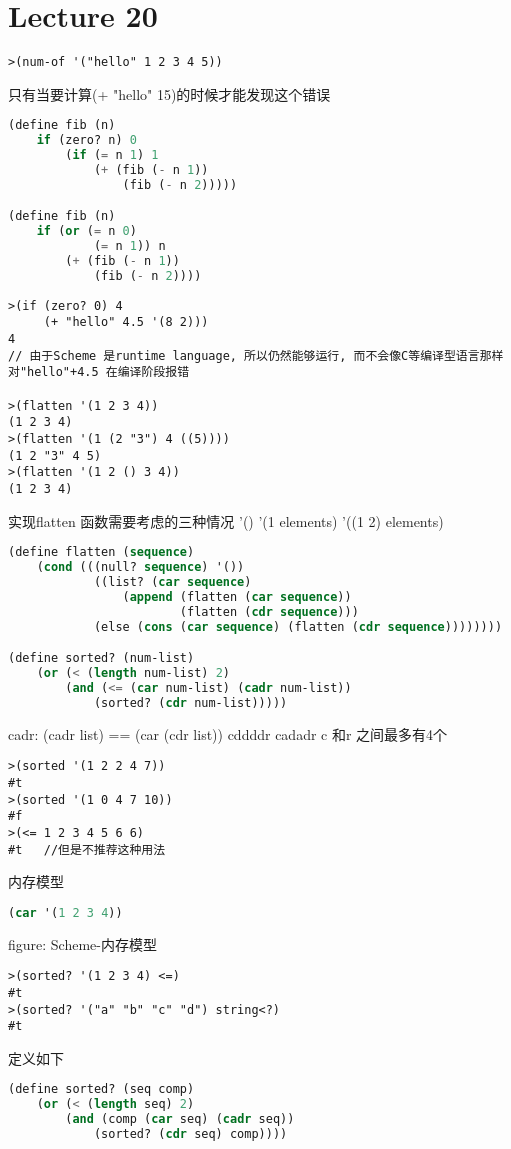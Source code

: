 \documentclass{article}
\begin{document}
\section{Lecture 20}
\begin{verbatim}
>(num-of '("hello" 1 2 3 4 5))
\end{verbatim}
只有当要计算(+ "hello" 15)的时候才能发现这个错误

\begin{lstlisting}[language = Lisp]
(define fib (n)
	if (zero? n) 0
		(if (= n 1) 1
			(+ (fib (- n 1))
				(fib (- n 2)))))

(define fib (n)
	if (or (= n 0)
			(= n 1)) n
		(+ (fib (- n 1))
			(fib (- n 2))))
\end{lstlisting}

\begin{verbatim}
>(if (zero? 0) 4
	 (+ "hello" 4.5 '(8 2)))
4
// 由于Scheme 是runtime language, 所以仍然能够运行, 而不会像C等编译型语言那样对"hello"+4.5 在编译阶段报错

>(flatten '(1 2 3 4))
(1 2 3 4)
>(flatten '(1 (2 "3") 4 ((5))))
(1 2 "3" 4 5)
>(flatten '(1 2 () 3 4))
(1 2 3 4)
\end{verbatim}

实现flatten 函数需要考虑的三种情况
'()
'(1 elements)
'((1 2) elements)

\begin{lstlisting}[language = Lisp]
(define flatten (sequence)
	(cond (((null? sequence) '())
			((list? (car sequence)
				(append (flatten (car sequence))
						(flatten (cdr sequence)))
			(else (cons (car sequence) (flatten (cdr sequence))))))))

(define sorted? (num-list)
	(or (< (length num-list) 2)
		(and (<= (car num-list) (cadr num-list))
			(sorted? (cdr num-list)))))
\end{lstlisting}
cadr: (cadr list) == (car (cdr list))
cddddr
cadadr
c 和r 之间最多有4个

\begin{verbatim}
>(sorted '(1 2 2 4 7))
#t
>(sorted '(1 0 4 7 10))
#f
>(<= 1 2 3 4 5 6 6)
#t   //但是不推荐这种用法
\end{verbatim}

内存模型
\begin{lstlisting}[language = Lisp]
(car '(1 2 3 4))
\end{lstlisting}
figure: Scheme-内存模型
 

\begin{verbatim}
>(sorted? '(1 2 3 4) <=)
#t
>(sorted? '("a" "b" "c" "d") string<?)
#t
\end{verbatim}
定义如下
\begin{lstlisting}[language = Lisp]
(define sorted? (seq comp)
	(or (< (length seq) 2)
		(and (comp (car seq) (cadr seq))
			(sorted? (cdr seq) comp))))
\end{lstlisting}
\end{document}
